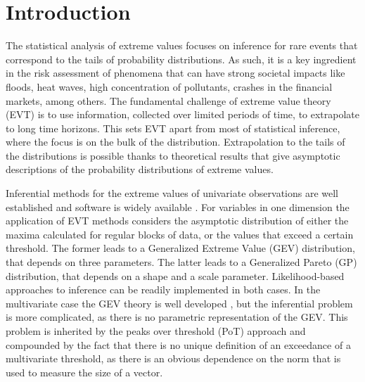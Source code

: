 
\section{Introduction}

The statistical analysis of extreme values focuses on inference for
rare events that correspond to the tails of probability distributions.
As such, it is a key ingredient in the risk assessment of
phenomena that can have strong societal impacts like floods, heat waves,
high concentration of pollutants, crashes in the financial markets,
among others. The fundamental challenge of extreme value theory (EVT) is
to use information, collected over limited periods of time, to
extrapolate to long time horizons. This sets EVT apart from most of
statistical inference, where the focus is on the bulk of the
distribution. Extrapolation to the tails of the distributions is
possible thanks to theoretical results that give asymptotic descriptions
of the probability distributions of extreme values. 

Inferential methods for the extreme values of univariate observations
are well established and software is widely available \cite[see, for example,][]{coles2001}. For variables 
in one dimension the application of EVT methods considers the asymptotic distribution of either the maxima 
calculated for regular blocks of data, or the values that exceed a certain threshold. The former leads to
a Generalized Extreme Value (GEV) distribution, that depends on three parameters. The latter leads to a 
Generalized Pareto (GP) distribution, that depends on a shape and a scale parameter. Likelihood-based 
approaches to inference can be readily implemented in both cases.
In the multivariate case the GEV theory is well developed \citep[see, for example][]{dehaan2006}, but the
inferential problem is more complicated, as there is no parametric representation of the GEV. This problem
is inherited by the peaks over threshold (PoT) approach and compounded by the fact that there is no unique definition of an 
exceedance of a multivariate threshold, as there is an obvious dependence on the norm that is used to
measure the size of a vector. 


